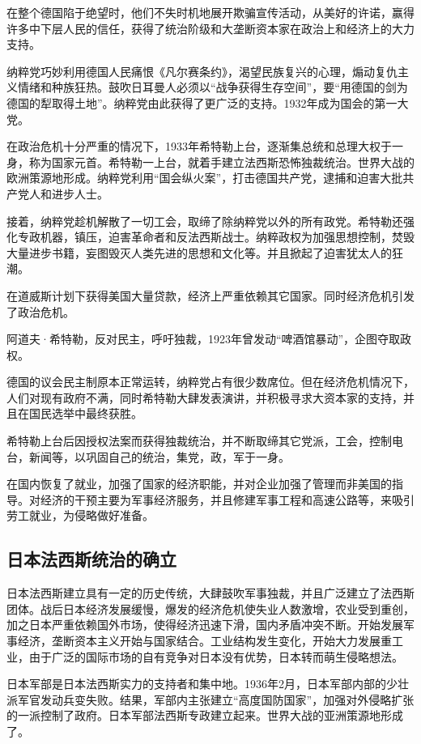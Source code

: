 在整个德国陷于绝望时，他们不失时机地展开欺骗宣传活动，从美好的许诺，赢得许多中下层人民的信任，获得了统治阶级和大垄断资本家在政治上和经济上的大力支持。

纳粹党巧妙利用德国人民痛恨《凡尔赛条约》，渴望民族复兴的心理，煽动复仇主义情绪和种族狂热。鼓吹日耳曼人必须以“战争获得生存空间”，要“用德国的剑为德国的犁取得土地”。纳粹党由此获得了更广泛的支持。1932年成为国会的第一大党。

在政治危机十分严重的情况下，1933年希特勒上台，逐渐集总统和总理大权于一身，称为国家元首。希特勒一上台，就着手建立法西斯恐怖独裁统治。世界大战的欧洲策源地形成。纳粹党利用“国会纵火案”，打击德国共产党，逮捕和迫害大批共产党人和进步人士。

接着，纳粹党趁机解散了一切工会，取缔了除纳粹党以外的所有政党。希特勒还强化专政机器，镇压，迫害革命者和反法西斯战士。纳粹政权为加强思想控制，焚毁大量进步书籍，妄图毁灭人类先进的思想和文化等。并且掀起了迫害犹太人的狂潮。

在道威斯计划下获得美国大量贷款，经济上严重依赖其它国家。同时经济危机引发了政治危机。

阿道夫·希特勒，反对民主，呼吁独裁，1923年曾发动“啤酒馆暴动”，企图夺取政权。

德国的议会民主制原本正常运转，纳粹党占有很少数席位。但在经济危机情况下，人们对现有政府不满，同时希特勒大肆发表演讲，并积极寻求大资本家的支持，并且在国民选举中最终获胜。

希特勒上台后因授权法案而获得独裁统治，并不断取缔其它党派，工会，控制电台，新闻等，以巩固自己的统治，集党，政，军于一身。

在国内恢复了就业，加强了国家的经济职能，并对企业加强了管理而非美国的指导。对经济的干预主要为军事经济服务，并且修建军事工程和高速公路等，来吸引劳工就业，为侵略做好准备。

\subsection{日本法西斯统治的确立}
日本法西斯建立具有一定的历史传统，大肆鼓吹军事独裁，并且广泛建立了法西斯团体。战后日本经济发展缓慢，爆发的经济危机使失业人数激增，农业受到重创，加之日本严重依赖国外市场，使得经济迅速下滑，国内矛盾冲突不断。开始发展军事经济，垄断资本主义开始与国家结合。工业结构发生变化，开始大力发展重工业，由于广泛的国际市场的自有竞争对日本没有优势，日本转而萌生侵略想法。

日本军部是日本法西斯实力的支持者和集中地。1936年2月，日本军部内部的少壮派军官发动兵变失败。结果，军部内主张建立“高度国防国家”，加强对外侵略扩张的一派控制了政府。日本军部法西斯专政建立起来。世界大战的亚洲策源地形成了。

